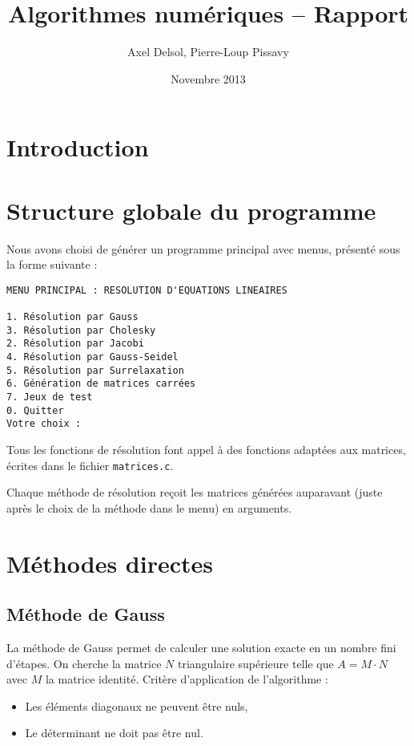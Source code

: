 \documentclass{report}
\title{Algorithmes numériques -- Rapport}
\author{Axel Delsol, Pierre-Loup Pissavy}
\date{Novembre 2013}
\begin{document}
  \maketitle
  \tableofcontents

  \chapter*{Introduction}
    \lipsum[1-5]
  \chapter{Structure globale du programme}
    Nous avons choisi de générer un programme principal avec menus, présenté sous la forme suivante :
    \begin{lstlisting}[linewidth=14cm,frame=single,breaklines=true, breakatwhitespace=true]
MENU PRINCIPAL : RESOLUTION D'EQUATIONS LINEAIRES

1. Résolution par Gauss
3. Résolution par Cholesky
2. Résolution par Jacobi
4. Résolution par Gauss-Seidel
5. Résolution par Surrelaxation
6. Génération de matrices carrées
7. Jeux de test
0. Quitter
Votre choix : 
	\end{lstlisting}
	Tous les fonctions de résolution font appel à des fonctions adaptées aux matrices, écrites dans le fichier \verb"matrices.c".
    
    Chaque méthode de résolution reçoit les matrices générées auparavant (juste après le choix de la méthode dans le menu) en arguments.
    
  \chapter{Méthodes directes}
    \section{Méthode de Gauss}
      La méthode de Gauss permet de calculer une solution exacte en un nombre fini d'étapes.
      \newline
      On cherche la matrice $N$ triangulaire supérieure telle que $A = M \cdot N$ avec $M$ la matrice identité.
      \newline
      Critère d'application de l'algorithme :
      \begin{itemize}
        \item{Les éléments diagonaux ne peuvent être nuls,}
        \item{Le déterminant ne doit pas être nul.}
      \end{itemize}
        \lstset{language=C,showstringspaces=false}
\end{document}
